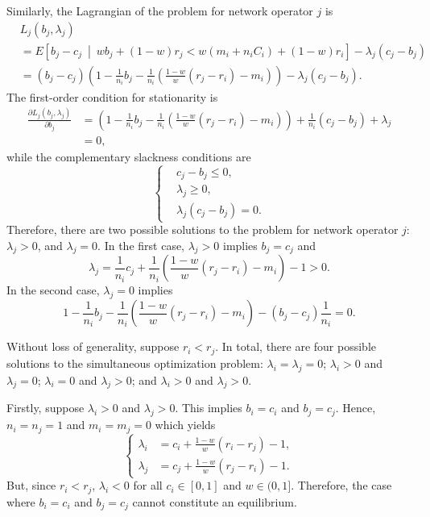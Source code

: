 Similarly, the Lagrangian of the problem for network operator $j$ is 
\begin{align}
	&L_j(b_j,\lambda_j) \nonumber\\
	&= E \left[ b_j-c_j \:\middle\vert\: wb_j + (1-w)r_j < w(m_i + n_i C_i) + (1-w)r_i\right] - \lambda_j(c_j-b_j) \nonumber\\
	&= (b_j-c_j)\left(1-\frac{1}{n_i}b_j - \frac{1}{n_i}\left(\frac{1-w}{w}(r_j-r_i)-m_i\right)\right) - \lambda_j(c_j-b_j).
	\label{eq:pcomp_langrangean_bidder_j_direct}
\end{align}
The first-order condition for stationarity is
\begin{align*}
	\frac{\partial L_j(b_j,\lambda_j)}{\partial b_j} &= \left( 1 - \frac{1}{n_i}b_j - \frac{1}{n_i}\left( \frac{1-w}{w}(r_j-r_i)-m_i \right) \right) + \frac{1}{n_i}\left(c_j-b_j\right) + \lambda_j\nonumber\\
	&=0,	
\end{align*}
while the complementary slackness conditions are
\begin{equation*}
	\left\{
	\begin{array}{ll}
		&c_j-b_j\le 0,\\
		&\lambda_j\ge 0,\\
		&\lambda_j(c_j-b_j) = 0.
	\end{array}
	\right.	
\end{equation*}
Therefore, there are two possible solutions to the problem for network operator $j$: $\lambda_j > 0$, and $\lambda_j=0$. In the first case, $\lambda_j > 0$ implies $b_j=c_j$ and
\begin{equation*}
	\lambda_j = \frac{1}{n_i}c_j + \frac{1}{n_i}\left( \frac{1-w}{w}(r_j-r_i) - m_i \right) - 1 > 0.
\end{equation*}
In the second case, $\lambda_j=0$ implies
\begin{equation*}
	1 - \frac{1}{n_i}b_j - \frac{1}{n_i}\left( \frac{1-w}{w}(r_j-r_i) - m_i \right) - (b_j-c_j)\frac{1}{n_i} = 0.
\end{equation*}

Without loss of generality, suppose $r_i<r_j$. In total, there are four possible solutions to the simultaneous optimization problem: $\lambda_i=\lambda_j=0$; $\lambda_i > 0$ and $\lambda_j=0$; $\lambda_i=0$ and $\lambda_j > 0$; and $\lambda_i > 0$ and $\lambda_j > 0$.

Firstly, suppose $\lambda_i > 0$ and $\lambda_j > 0$. This implies $b_i=c_i$ and $b_j=c_j$. Hence, $n_i=n_j=1$ and $m_i=m_j=0$ which yields
\begin{equation*}
	\left\{
	\begin{array}{ll}
		\lambda_i &= c_i + \displaystyle\frac{1-w}{w}(r_i-r_j)-1,\\[2ex]
		\lambda_j &= c_j + \displaystyle\frac{1-w}{w}(r_j-r_i)-1.
	\end{array}
	\right.
\end{equation*}
But, since $r_i < r_j$, $\lambda_i < 0$ for all $c_i\in[0,1]$ and $w\in(0,1]$. Therefore, the case where $b_i=c_i$ and $b_j=c_j$ cannot constitute an equilibrium.

